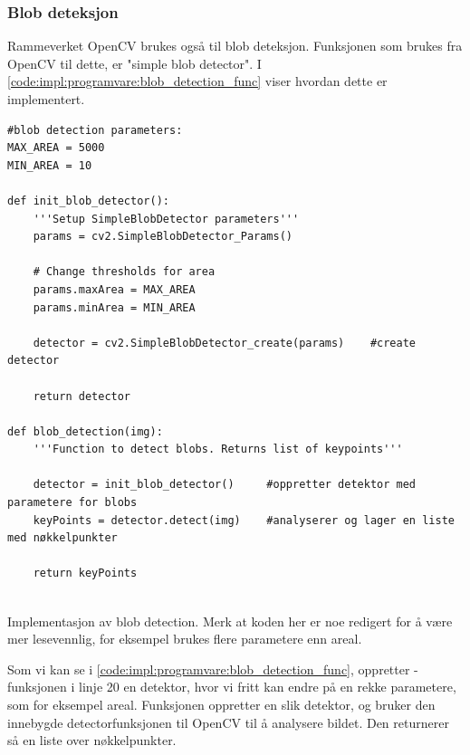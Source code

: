 \subsubsection{Blob deteksjon}\label{sec:impl:programvare:blob-detection}

Rammeverket OpenCV brukes også til blob deteksjon. Funksjonen som brukes fra OpenCV til dette, er "simple blob detector". 
I \autoref{code:impl:programvare:blob_detection_func} viser hvordan dette er implementert. 

\begin{listing}[!htb]
\begin{verbatim}
#blob detection parameters:
MAX_AREA = 5000
MIN_AREA = 10

def init_blob_detector():
    '''Setup SimpleBlobDetector parameters'''
    params = cv2.SimpleBlobDetector_Params()

    # Change thresholds for area
    params.maxArea = MAX_AREA
    params.minArea = MIN_AREA

    detector = cv2.SimpleBlobDetector_create(params)    #create detector

    return detector
    
def blob_detection(img):
    '''Function to detect blobs. Returns list of keypoints'''

    detector = init_blob_detector()     #oppretter detektor med parametere for blobs
    keyPoints = detector.detect(img)    #analyserer og lager en liste med nøkkelpunkter
    
    return keyPoints
    
\end{verbatim}
\caption{Implementasjon av blob detection. Merk at koden her er noe redigert for å være mer lesevennlig, for eksempel brukes flere parametere enn areal. }
\label{code:impl:programvare:blob_detection_func}
\end{listing}

Som vi kan se i \autoref{code:impl:programvare:blob_detection_func}, oppretter -funksjonen i linje 20 en detektor, hvor vi fritt kan endre på en rekke parametere, som for eksempel areal.  
Funksjonen  oppretter en slik detektor, og bruker den innebygde detectorfunksjonen til OpenCV til å analysere bildet. 
Den returnerer så en liste over nøkkelpunkter. 

